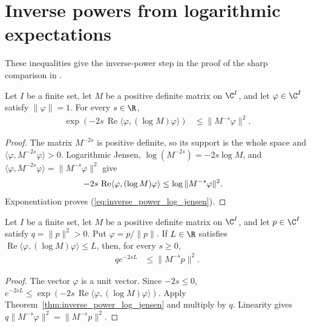 \section{Inverse powers from logarithmic expectations}
\label{sec:inverse_power_log_jensen}

These inequalities give the inverse-power step in the proof of the sharp
comparison in \cite[lines~383--395 of the norm-comparison argument]{OpenAI2026AreaLaw}.

\begin{theorem}
\label{thm:inverse_power_log_jensen}
\leanok
Let $I$ be a finite set, let $M$ be a positive definite matrix on $\C^I$,
and let $\varphi\in\C^I$ satisfy $\|\varphi\|=1$. For every $s\in\R$,
\begin{align}
 \exp\!\left(-2s\,\operatorname{Re}
   \langle\varphi,(\log M)\varphi\rangle\right)
 &\le \|M^{-s}\varphi\|^2.
 \label{eq:inverse_power_log_jensen}
\end{align}
\end{theorem}
\begin{proof}\leanok
{}
The matrix $M^{-2s}$ is positive definite, so its support is the whole
space and $\langle\varphi,M^{-2s}\varphi\rangle>0$.
Logarithmic Jensen, $\log(M^{-2s})=-2s\log M$, and
$\langle\varphi,M^{-2s}\varphi\rangle=\|M^{-s}\varphi\|^2$ give
\begin{align}
 -2s\,\operatorname{Re}\langle\varphi,(\log M)\varphi\rangle
 &\le \log\|M^{-s}\varphi\|^2. \notag
\end{align}
Exponentiation proves (\ref{eq:inverse_power_log_jensen}).
\end{proof}

\begin{theorem}
\label{thm:inverse_power_normalized_log_bound}
\leanok
Let $I$ be a finite set, let $M$ be a positive definite matrix on $\C^I$,
and let $p\in\C^I$ satisfy $q=\|p\|^2>0$. Put $\varphi=p/\|p\|$.
If $L\in\R$ satisfies
$\operatorname{Re}\langle\varphi,(\log M)\varphi\rangle\le L$, then,
for every $s\ge0$,
\begin{align}
 q e^{-2sL}&\le\|M^{-s}p\|^2.
 \label{eq:inverse_power_mass_bound}
\end{align}
\end{theorem}
\begin{proof}\leanok
{}
The vector $\varphi$ is a unit vector. Since $-2s\le0$,
$e^{-2sL}\le
 \exp(-2s\,\operatorname{Re}\langle\varphi,(\log M)\varphi\rangle)$.
Apply Theorem~\ref{thm:inverse_power_log_jensen} and multiply by $q$.
Linearity gives $q\|M^{-s}\varphi\|^2=\|M^{-s}p\|^2$.
\end{proof}
